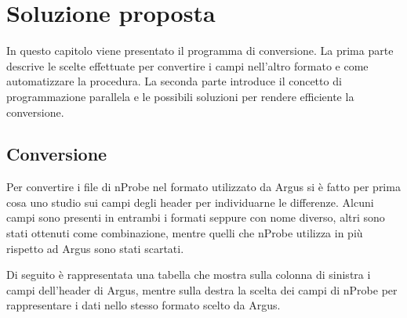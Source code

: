 \documentclass[../main.tex]{subfiles}
\begin{document}
\chapter{Soluzione proposta}

In questo capitolo viene presentato il programma di conversione. La prima parte descrive le scelte effettuate per convertire i campi nell'altro formato e come automatizzare la procedura. La seconda parte introduce il concetto di programmazione parallela e le possibili soluzioni per rendere efficiente la conversione.


\section{Conversione}
Per convertire i file di nProbe nel formato utilizzato da Argus si è fatto per prima cosa uno studio sui campi degli header per individuarne le differenze. Alcuni campi sono presenti in entrambi i formati seppure con nome diverso, altri sono stati ottenuti come combinazione, mentre quelli che nProbe utilizza in più rispetto ad Argus sono stati scartati. 

Di seguito è rappresentata una tabella che mostra sulla colonna di sinistra i campi dell'header di Argus, mentre sulla destra la scelta dei campi di nProbe per rappresentare i dati nello stesso formato scelto da Argus.
\end{document}
